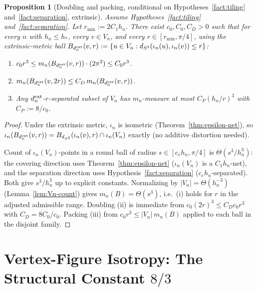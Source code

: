 \documentclass[11pt, a4paper]{amsart}
\newtheorem{proposition}[theorem]{Proposition}
\theoremstyle{definition}
\newcommand{\dsph}{d_{S^3}}
\begin{document}
\begin{proposition}[Doubling and packing, conditional on Hypotheses~\ref{fact:tiling} and~\ref{fact:separation}, extrinsic]
\label{prop:doubling}
\emph{Assume Hypotheses~\ref{fact:tiling} and~\ref{fact:separation}.}
Let $r_{\min} := 2 C_1 h_n$. There exist $c_0, C_0, C_D > 0$
such that for every $n$ with $h_n \leq h_\ast$, every $v \in
V_n$, and every $r \in [r_{\min}, \pi/4]$, using the
\emph{extrinsic}-metric ball $B_{d_n^{\rm ext}}(v, r) := \{u
\in V_n : \dsph(\iota_n(u), \iota_n(v)) \leq r\}$:
\begin{enumerate}
\item[\textup{(i)}] $c_0 r^3 \leq m_n(B_{d_n^{\rm ext}}(v, r))
  \cdot (2\pi^2) \leq C_0 r^3$.
\item[\textup{(ii)}] $m_n(B_{d_n^{\rm ext}}(v, 2r)) \leq
  C_D\,m_n(B_{d_n^{\rm ext}}(v, r))$.
\item[\textup{(iii)}] Any $d_n^{\rm ext}$-$r$-separated subset
  of $V_n$ has $m_n$-measure at most $C_P (h_n/r)^3$ with $C_P
  := 8/c_0$.
\end{enumerate}
\end{proposition}

\begin{proof}
Under the extrinsic metric, $\iota_n$ is isometric
(Theorem~\ref{thm:epsilon-net}), so $\iota_n(B_{d_n^{\rm ext}}(v,
r)) = B_{\dsph}(\iota_n(v), r) \cap \iota_n(V_n)$ exactly (no
additive distortion needed).

Count of $\iota_n(V_n)$-points in a round ball of radius $s \in
[c_e h_n, \pi/4]$ is $\Theta(s^3 / h_n^3)$: the covering
direction uses Theorem~\ref{thm:epsilon-net} ($\iota_n(V_n)$
is a $C_1 h_n$-net), and the separation direction uses
Hypothesis~\ref{fact:separation} ($c_e h_n$-separated). Both give
$s^3 / h_n^3$ up to explicit constants. Normalizing by $|V_n| =
\Theta(h_n^{-3})$ (Lemma~\ref{lem:Vn-count}) gives
$m_n(B) = \Theta(s^3)$, i.e.\ (i) holds for $r$ in the adjusted
admissible range. Doubling (ii) is immediate from $c_0 (2r)^3
\leq C_D c_0 r^3$ with $C_D = 8 C_0/c_0$. Packing (iii) from
$c_0 r^3 \leq |V_n|\,m_n(B)$ applied to each
ball in the disjoint family.
\end{proof}

\section{Vertex-Figure Isotropy: The Structural Constant $8/3$}
\label{sec:isotropy}
\end{document}
